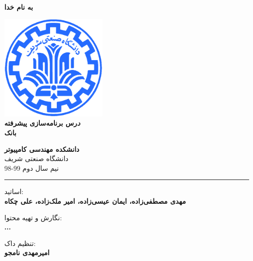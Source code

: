 \documentclass[]{article}
\begin{document}
\begin{titlepage}
\begin{center}

\textbf{ \Huge{به نام خدا} }
        
\vspace{0.2cm}

\includegraphics[width=0.4\textwidth]{sharif1.png}\\
\vspace{0.2cm}
\textbf{ \Huge{\emph درس برنامه‌سازی پیشرفته} }\\
\vspace{0.25cm}
\textbf{ \Large{بانک} }
\vspace{0.2cm}
       
 
      \large \textbf{دانشکده مهندسی کامپیوتر}\\\vspace{0.1cm}
    \large   دانشگاه صنعتی شریف\\\vspace{0.2cm}
       \large   ﻧﯿﻢ سال دوم 99-98 \\\vspace{0.10cm}
      \noindent\rule[1ex]{\linewidth}{1pt}
اساتید:\\
    \textbf{{مهدی مصطفی‌زاده، ایمان عیسی‌زاده، امیر ملک‌زاده، علی چکاه}}



        \vspace{0.10cm}
نگارش و تهیه محتوا:\\
    \textbf{{...}}
    
       \vspace{0.10cm}
       تنظیم داک:\\
    \textbf{{امیرمهدی نامجو}}

    
        \vspace{0.05cm}
    

\end{center}
\end{titlepage}
\end{document}
